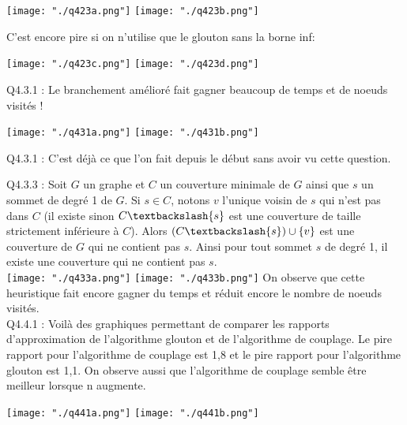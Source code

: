 \documentclass[a4paper]{article}
\begin{document}
\texttt{[image: "./q423a.png"]}
\texttt{[image: "./q423b.png"]}

C'est encore pire si on n'utilise que le glouton sans la borne inf:

\texttt{[image: "./q423c.png"]}
\texttt{[image: "./q423d.png"]}

Q4.3.1 : 
Le branchement amélioré fait gagner beaucoup de temps et de noeuds visités !

\texttt{[image: "./q431a.png"]}
\texttt{[image: "./q431b.png"]}

Q4.3.1 : 
C'est déjà ce que l'on fait depuis le début sans avoir vu cette question.

Q4.3.3 :
Soit $G$ un graphe et $C$ un couverture minimale de $G$ ainsi que $s$ un sommet de degré 1 de $G$. Si $s \in C$, notons $v$ l'unique voisin de $s$ qui n'est pas dans $C$ (il existe sinon $C\textbackslash\{s\}$ est une couverture de taille strictement inférieure à $C$). Alors $(C\textbackslash\{s\}) \cup \{v\}$ est une couverture de $G$ qui ne contient pas $s$. Ainsi pour tout sommet $s$ de degré 1, il existe une couverture qui ne contient pas $s$. \\
\texttt{[image: "./q433a.png"]}
\texttt{[image: "./q433b.png"]}
On observe que cette heuristique fait encore gagner du temps et réduit encore le nombre de noeuds visités. \\

Q4.4.1 : 
Voilà des graphiques permettant de comparer les rapports d'approximation de l'algorithme glouton et de l'algorithme de couplage. Le pire rapport pour l'algorithme de couplage est 1,8 et le pire rapport pour l'algorithme glouton est 1,1. On observe aussi que l'algorithme de couplage semble être meilleur lorsque n augmente.

\texttt{[image: "./q441a.png"]}
\texttt{[image: "./q441b.png"]}
\end{document}

